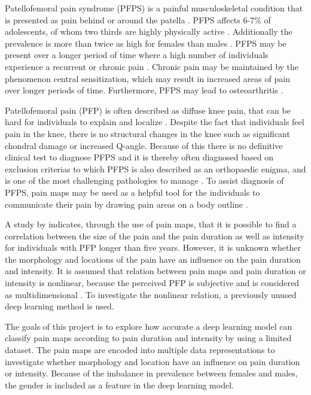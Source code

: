 Patellofemoral pain syndrome (PFPS) is a painful musculoskeletal condition that is presented as pain behind or around the patella \citep{Maclachlan2017, Smith2015}. PFPS affects 6-7\% of adolescents, of whom two thirds are highly physically active \citep{Rathleff2015}. Additionally the prevalence is more than twice as high for females than males \citep{Rathleff2015, Petersen2013}.
PFPS may be present over a longer period of time where a high number of individuals experience a recurrent or chronic pain \citep{Witvrouw2014}. Chronic pain may be maintained by the phenomenon central sensitization, which may result in increased areas of pain over longer periods of time. Furthermore, PFPS may lead to osteoarthritis \citep{Petersen2013, Crossley2016}. 

\noindent
Patellofemoral pain (PFP) is often described as diffuse knee pain, that can be hard for individuals to explain and localize \citep{Witvrouw2014}. Despite the fact that individuals feel pain in the knee, there is no structural changes in the knee such as significant chondral damage or increased Q-angle. Because of this there is no definitive clinical test to diagnose PFPS and it is thereby often diagnosed based on exclusion criterias \citep{Petersen2013} to which PFPS is also described as an orthopaedic enigma, and is one of the most challenging pathologies to manage \citep{Dye2001}.
To assist diagnosis of PFPS, pain maps may be used as a helpful tool for the individuals to communicate their pain by drawing pain areas on a body outline \citep{Boudreau2016}.

\noindent
A study by \citeauthor{Boudreau2017} indicates, through the use of pain maps, that it is possible to find a correlation between the size of the pain and the pain duration as well as intensity for individuals with PFP longer than five years.\citep{Boudreau2017} However, it is unknown whether the morphology and locations of the pain have an influence on the pain duration and intensity.
It is assumed that relation between pain maps and pain duration or intensity is nonlinear, because the perceived PFP is subjective and is considered as multidimensional \citep{Dansie2013}. To investigate the nonlinear relation, a previously unused deep learning method is used.

\noindent
The goals of this project is to explore how accurate a deep learning model can classify pain maps according to pain duration and intensity by using a limited dataset. The pain maps are encoded into multiple data representations to investigate whether morphology and location have an influence on pain duration or intensity. Because of the imbalance in prevalence between females and males, the gender is included as a feature in the deep learning model. \newline

